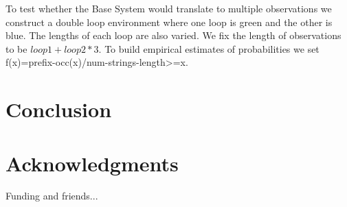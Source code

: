 \documentclass[letterpaper]{article}
\begin{document}
To test whether the Base System would translate to multiple observations we construct a double loop environment where one loop is green and the other is blue. The lengths of each loop are also varied. We fix the length of observations to be $loop1 + loop2 * 3$. To build empirical estimates of probabilities we set f(x)=prefix-occ(x)/num-strings-length>=x.

\section{Conclusion}

\section{Acknowledgments}
Funding and friends...



\end{document}
